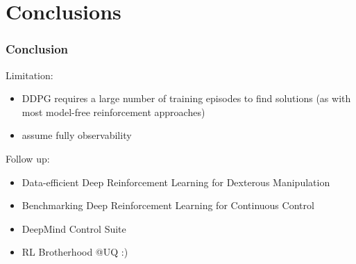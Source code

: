 \section{Conclusions}

\begin{frame}
\frametitle{Conclusion}
Limitation:
\begin{itemize}
  \item DDPG requires a large number of training episodes to find solutions
  (as with most model-free reinforcement approaches)
  \item assume fully observability
\end{itemize}

Follow up:
\begin{itemize}
\item Data-efficient Deep Reinforcement Learning for Dexterous Manipulation
\item Benchmarking Deep Reinforcement Learning for Continuous Control
\item DeepMind Control Suite
\item RL Brotherhood @UQ :)
\end{itemize}

\end{frame}

